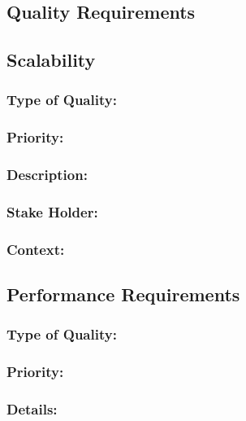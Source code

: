 \documentclass[11pt]{article}
\begin{document}
	\newpage
	\begin{center}
	\section{\textbf{\huge{Quality Requirements}}}
	\end{center}
	\subsection{Scalability}
		\subsubsection{Type of Quality:}
			\textbf{}
		
		\subsubsection{Priority:}
			\textbf{}
		
		\subsubsection{Description:}
			\textbf{}
		
		\subsubsection{Stake Holder:}
			\textbf{}

		\subsubsection{Context:}
			\textbf{}
		
	\subsection{Performance Requirements}
		\subsubsection{Type of Quality:}
			\textbf{}
		
		\subsubsection{Priority:}
			\textbf{}
		
		\subsubsection{Details:}
			\textbf{}
		
\end{document}
